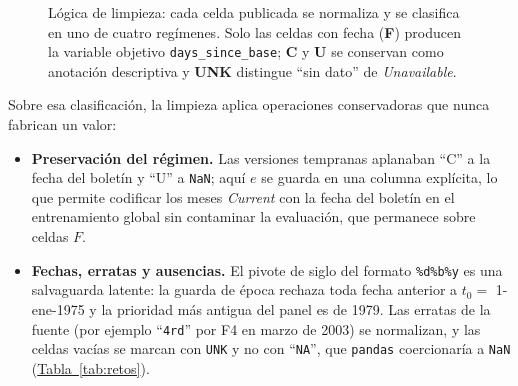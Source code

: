 \documentclass[12pt,letterpaper]{report}
\begin{document}
\begin{figure}[htbp]
\caption[Clasificación y conversión de cada celda]{Lógica de limpieza: cada celda publicada se
normaliza y se clasifica en uno de cuatro regímenes. Solo las celdas con fecha (\textbf{F})
producen la variable objetivo \texttt{days\_since\_base}; \textbf{C} y \textbf{U} se conservan
como anotación descriptiva y \textbf{UNK} distingue ``sin dato'' de \textit{Unavailable}.}
\label{fig:cleansing}
\end{figure}

Sobre esa clasificación, la limpieza aplica operaciones conservadoras que nunca fabrican un
valor:

\begin{itemize}[leftmargin=*, itemsep=1pt, topsep=2pt]
\item \textbf{Preservación del régimen.} Las versiones tempranas aplanaban ``C'' a la fecha del
boletín y ``U'' a \texttt{NaN}; aquí $e$ se guarda en una columna explícita, lo que permite codificar
los meses \textit{Current} con la fecha del boletín en el entrenamiento global sin contaminar la
evaluación, que permanece sobre celdas $F$.
\item \textbf{Fechas, erratas y ausencias.} El pivote de siglo del formato \texttt{\%d\%b\%y} es una
salvaguarda latente: la guarda de época rechaza toda fecha anterior a $t_0=$ 1-ene-1975 y la
prioridad más antigua del panel es de 1979. Las erratas de la fuente (por ejemplo ``\texttt{4rd}''
por F4 en marzo de 2003) se normalizan, y las celdas vacías se marcan con \texttt{UNK} y no con
``\texttt{NA}'', que \texttt{pandas} coercionaría a \texttt{NaN} (\hyperref[tab:retos]{Tabla~\ref*{tab:retos}}).
\end{itemize}
\end{document}
